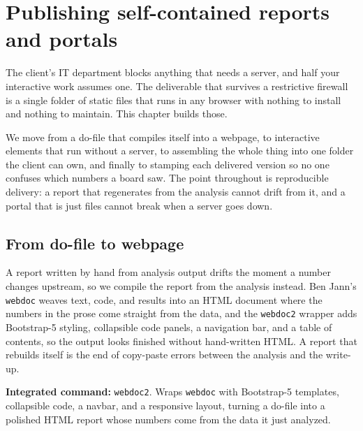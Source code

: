 \documentclass[
    a4paper,
    fontsize=10pt,
    twoside=true,
    numbers=noenddot,
]{kaobook}
\begin{document}
\chapter{Publishing self-contained reports and portals}\label{ch:portals}

The client's IT department blocks anything that needs a server, and half your interactive work assumes one. The deliverable that survives a restrictive firewall is a single folder of static files that runs in any browser with nothing to install and nothing to maintain. This chapter builds those.

We move from a do-file that compiles itself into a webpage, to interactive elements that run without a server, to assembling the whole thing into one folder the client can own, and finally to stamping each delivered version so no one confuses which numbers a board saw. The point throughout is reproducible delivery: a report that regenerates from the analysis cannot drift from it, and a portal that is just files cannot break when a server goes down.

\section{From do-file to webpage}
A report written by hand from analysis output drifts the moment a number changes upstream, so we compile the report from the analysis instead. Ben Jann's \texttt{webdoc} weaves text, code, and results into an HTML document where the numbers in the prose come straight from the data, and the \texttt{webdoc2} wrapper adds Bootstrap-5 styling, collapsible code panels, a navigation bar, and a table of contents, so the output looks finished without hand-written HTML. A report that rebuilds itself is the end of copy-paste errors between the analysis and the write-up.

\begin{kaobox}[frametitle=Package Integration: \texttt{webdoc2}]
\textbf{Integrated command:} \texttt{webdoc2}. Wraps \texttt{webdoc} with Bootstrap-5 templates, collapsible code, a navbar, and a responsive layout, turning a do-file into a polished HTML report whose numbers come from the data it just analyzed.
\end{kaobox}
\end{document}
